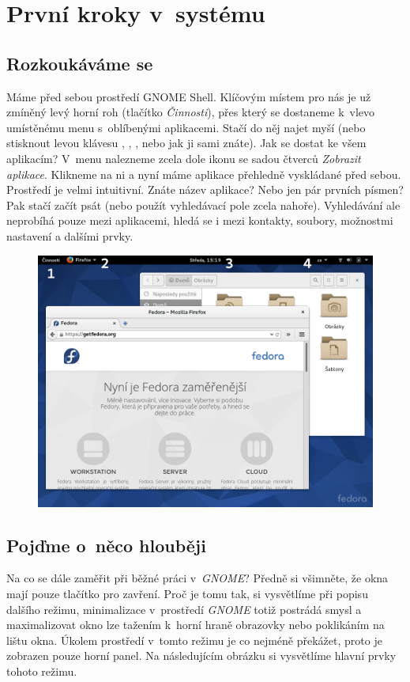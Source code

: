 \chapter*{První kroky v~systému}

\section*{Rozkoukáváme se}
Máme před sebou prostředí GNOME Shell. Klíčovým místem pro nás je už zmíněný levý horní roh (tlačítko \emph{Činnosti}), přes který se dostaneme k~vlevo umístěnému menu s~oblíbenými aplikacemi. Stačí do něj najet myší (nebo stisknout levou klávesu , , , nebo jak ji sami znáte). Jak se dostat ke všem aplikacím? V~menu nalezneme zcela dole ikonu se sadou čtverců \emph{Zobrazit aplikace}. Klikneme na ni a nyní máme aplikace přehledně vyskládané před sebou. Prostředí je velmi intuitivní. Znáte název aplikace? Nebo jen pár prvních písmen? Pak stačí začít psát (nebo použít vyhledávací pole zcela nahoře). Vyhledávání ale neprobíhá pouze mezi aplikacemi, hledá se i mezi kontakty, soubory, možnostmi nastavení a dalšími prvky.

\begin{figure}[t]
\begin{center}
\includegraphics[width=\textwidth]{img/shell-a}
 \label{fig:shell-a}
\end{center}
\end{figure}

\section*{Pojďme o~něco hlouběji}
Na co se dále zaměřit při běžné práci v~\emph{GNOME}? Předně si všimněte, že okna mají pouze tlačítko pro zavření. Proč je tomu tak, si vysvětlíme při popisu dalšího režimu, minimalizace v~prostředí \emph{GNOME} totiž postrádá smysl a maximalizovat okno lze tažením k~horní hraně obrazovky nebo poklikáním na lištu okna. Úkolem prostředí v~tomto režimu je co nejméně překážet, proto je zobrazen pouze horní panel. Na následujícím obrázku si vysvětlíme hlavní prvky tohoto režimu.

